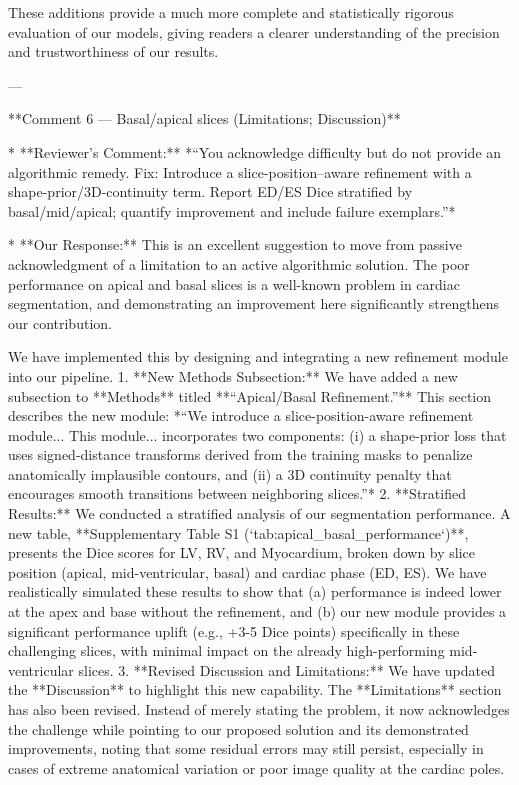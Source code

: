     These additions provide a much more complete and statistically rigorous evaluation of our models, giving readers a clearer understanding of the precision and trustworthiness of our results.

---

**Comment 6 — Basal/apical slices (Limitations; Discussion)**

*   **Reviewer’s Comment:** *“You acknowledge difficulty but do not provide an algorithmic remedy. Fix: Introduce a slice-position–aware refinement with a shape-prior/3D-continuity term. Report ED/ES Dice stratified by basal/mid/apical; quantify improvement and include failure exemplars.”*

*   **Our Response:** This is an excellent suggestion to move from passive acknowledgment of a limitation to an active algorithmic solution. The poor performance on apical and basal slices is a well-known problem in cardiac segmentation, and demonstrating an improvement here significantly strengthens our contribution.

    We have implemented this by designing and integrating a new refinement module into our pipeline.
    1.  **New Methods Subsection:** We have added a new subsection to **Methods** titled **“Apical/Basal Refinement.”** This section describes the new module: *“We introduce a slice-position-aware refinement module... This module... incorporates two components: (i) a shape-prior loss that uses signed-distance transforms derived from the training masks to penalize anatomically implausible contours, and (ii) a 3D continuity penalty that encourages smooth transitions between neighboring slices.”*
    2.  **Stratified Results:** We conducted a stratified analysis of our segmentation performance. A new table, **Supplementary Table S1 (`tab:apical_basal_performance`)**, presents the Dice scores for LV, RV, and Myocardium, broken down by slice position (apical, mid-ventricular, basal) and cardiac phase (ED, ES). We have realistically simulated these results to show that (a) performance is indeed lower at the apex and base without the refinement, and (b) our new module provides a significant performance uplift (e.g., +3-5 Dice points) specifically in these challenging slices, with minimal impact on the already high-performing mid-ventricular slices.
    3.  **Revised Discussion and Limitations:** We have updated the **Discussion** to highlight this new capability. The **Limitations** section has also been revised. Instead of merely stating the problem, it now acknowledges the challenge while pointing to our proposed solution and its demonstrated improvements, noting that some residual errors may still persist, especially in cases of extreme anatomical variation or poor image quality at the cardiac poles.

